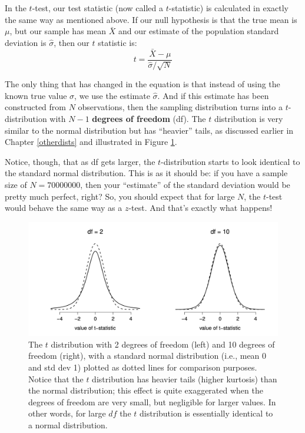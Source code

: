 \documentclass[
  11pt,
  a4paper,
  twoside,symmetric,openright]{book}
\theoremstyle{break}
\theoremstyle{break}
\begin{document}
In the \(t\)-test, our test statistic (now called a \(t\)-statistic) is calculated in exactly the same way as mentioned above. If our null hypothesis is that the true mean is \(\mu\), but our sample has mean \(\bar{X}\) and our estimate of the population standard deviation is \(\hat{\sigma}\), then our \(t\) statistic is:
\[
t = \frac{\bar{X} - \mu}{\hat{\sigma}/\sqrt{N} }
\]

The only thing that has changed in the equation is that instead of using the known true value \(\sigma\), we use the estimate \(\hat{\sigma}\). And if this estimate has been constructed from \(N\) observations, then the sampling distribution turns into a \(t\)-distribution with \(N-1\) \textbf{degrees of freedom} (df). The \(t\) distribution is very similar to the normal distribution but has ``heavier'' tails, as discussed earlier in Chapter \ref{otherdists} and illustrated in Figure \ref{fig:ttestdist}.

Notice, though, that as df gets larger, the \(t\)-distribution starts to look identical to the standard normal distribution. This is as it should be: if you have a sample size of \(N = 70000000\), then your ``estimate'' of the standard deviation would be pretty much perfect, right? So, you should expect that for large \(N\), the \(t\)-test would behave the same way as a \(z\)-test. And that's exactly what happens!

\begin{figure}

{\centering \includegraphics[width=0.6\linewidth]{resources/image/ttestdist} 

}

\caption{The $t$ distribution with 2 degrees of freedom (left) and 10 degrees of freedom (right), with a standard normal distribution (i.e., mean 0 and std dev 1) plotted as dotted lines for comparison purposes. Notice that the $t$ distribution has heavier tails (higher kurtosis) than the normal distribution; this effect is quite exaggerated when the degrees of freedom are very small, but negligible for larger values. In other words, for large $df$ the $t$ distribution is essentially identical to a normal distribution.}\label{fig:ttestdist}
\end{figure}
\end{document}
